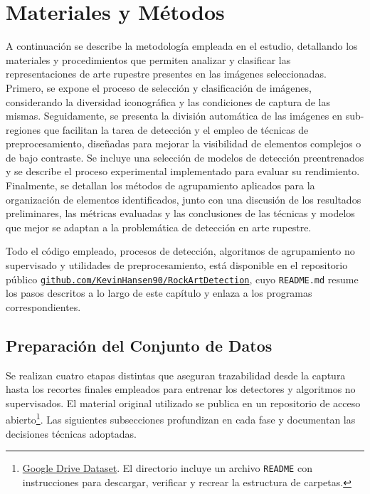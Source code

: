 \chapter{Materiales y Métodos}

A continuación se describe la metodología empleada en el estudio, detallando los materiales y procedimientos que permiten analizar y clasificar las representaciones de arte rupestre presentes en las imágenes seleccionadas.
Primero, se expone el proceso de selección y clasificación de imágenes, considerando la diversidad iconográfica y las condiciones de captura de las mismas.
Seguidamente, se presenta la división automática de las imágenes en sub-regiones que facilitan la tarea de detección y el empleo de técnicas de preprocesamiento, diseñadas para mejorar la visibilidad de elementos complejos o de bajo contraste.
Se incluye una selección de modelos de detección preentrenados y se describe el proceso experimental implementado para evaluar su rendimiento.
Finalmente, se detallan los métodos de agrupamiento aplicados para la organización de elementos identificados, junto con una discusión de los resultados preliminares, las métricas evaluadas y las conclusiones de las técnicas y modelos que mejor se adaptan a la problemática de detección en arte rupestre.


\noindent
Todo el código empleado, procesos de detección, algoritmos de agrupamiento no supervisado y utilidades de preprocesamiento, está disponible en el repositorio público
\href{https://github.com/KevinHansen90/RockArtDetection}{\texttt{github.com/KevinHansen90/RockArtDetection}}, cuyo \texttt{README.md} resume los pasos descritos a lo largo de este capítulo y enlaza a los programas correspondientes.

\section{Preparación del Conjunto de Datos}

Se realizan cuatro etapas distintas que aseguran trazabilidad desde la captura hasta los recortes finales empleados para entrenar los detectores y algoritmos no supervisados.
El material original utilizado se publica en un repositorio de acceso abierto\footnote{\href{https://drive.google.com/drive/u/0/folders/1JU5tohaRw7Rm83S9uUK9KazIPLRebl1x}{Google Drive Dataset}.
El directorio incluye un archivo \texttt{README} con instrucciones para descargar, verificar y recrear la estructura de carpetas.}.
Las siguientes subsecciones profundizan en cada fase y documentan las decisiones técnicas adoptadas.

